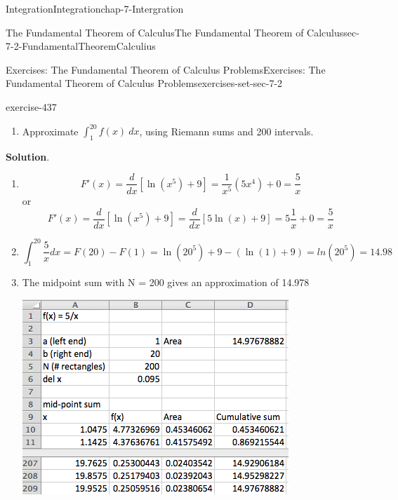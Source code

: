 \documentclass[oneside,10pt,]{book}
\numberwithin{equation}{section}
\begin{document}
\begin{chapterptx}{Integration}{}{Integration}{}{}{chap-7-Intergration}
\begin{sectionptx}{The Fundamental Theorem of Calculus}{}{The Fundamental Theorem of Calculus}{}{}{sec-7-2-FundamentalTheoremCalculius}
\begin{exercises-subsection-numberless}{Exercises: The Fundamental Theorem of Calculus Problems}{}{Exercises: The Fundamental Theorem of Calculus Problems}{}{}{exercises-set-sec-7-2}
\begin{divisionexercise}{3}{}{}{exercise-437}
\begin{enumerate}[label=(\alph*)]
Use the fundamental theorem of calculus to evaluate \(\int_1^{20} f(x)\ dx\).%
\item\hypertarget{li-721}{}\hypertarget{p-2670}{}%
Approximate \(\int_1^{20} f(x)\ dx\), using Riemann sums and 200 intervals.%
\end{enumerate}
\par\smallskip%
\noindent\textbf{Solution}.\hypertarget{solution-221}{}\quad%
\leavevmode%
\begin{enumerate}[label=(\alph*)]
\item\hypertarget{li-722}{}%
\begin{equation*}
F' (x)=\frac{d}{dx} [\ln(x^5 )+ 9]=\frac{1}{x^5}   (5x^4 )+ 0=\frac{5}{x}
\end{equation*}
\hypertarget{p-2671}{}%
or%
%
\begin{equation*}
F' (x)=\frac{d}{dx} [\ln(x^5 )+ 9]=\frac{d}{dx} [5\ln(x)+ 9]=5\frac{1}{x}+ 0=\frac{5}{x}
\end{equation*}
\item\hypertarget{li-723}{}%
\begin{equation*}
\int_1^{20}\frac{5}{x} dx=F(20)-F(1)=\ln(20^5 )+9-(\ln(1)+9)=ln(20^5) =14.98
\end{equation*}
%
\item\hypertarget{li-724}{}\hypertarget{p-2672}{}%
The midpoint sum with N = 200 gives an approximation of 14.978%
\begin{sidebyside}{1}{0.25}{0.25}{0}%
\begin{sbspanel}{0.5}%
\includegraphics[width=1\linewidth]{images/sec7-2-sol3a.png}
\end{sbspanel}%
\end{sidebyside}%

\end{enumerate}
\end{divisionexercise}
\end{exercises-subsection-numberless}
\end{sectionptx}
\end{chapterptx}
\end{document}
